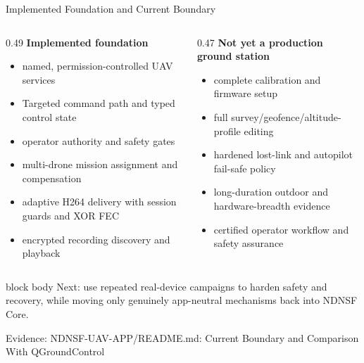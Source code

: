\documentclass[aspectratio=169]{beamer}
\newcommand{\bluebox}[1]{%
  \begin{beamercolorbox}[rounded=true,shadow=false,sep=0.65em,wd=0.94\linewidth]{block body}
  #1
  \end{beamercolorbox}
}
\newcommand{\evidence}[1]{%
  \vfill\par\noindent
  \begin{minipage}{\linewidth}
  \raggedright{\color{SoftGray}\tiny Evidence: #1}\par
  \end{minipage}
}
\begin{document}
\begin{frame}{Implemented Foundation and Current Boundary}
\footnotesize
\begin{columns}[T]
\begin{column}{0.49\textwidth}
\textbf{Implemented foundation}
\begin{itemize}
  \item named, permission-controlled UAV services
  \item Targeted command path and typed control state
  \item operator authority and safety gates
  \item multi-drone mission assignment and compensation
  \item adaptive H264 delivery with session guards and XOR FEC
  \item encrypted recording discovery and playback
\end{itemize}
\end{column}
\begin{column}{0.47\textwidth}
\textbf{Not yet a production ground station}
\begin{itemize}
  \item complete calibration and firmware setup
  \item full survey/geofence/altitude-profile editing
  \item hardened lost-link and autopilot fail-safe policy
  \item long-duration outdoor and hardware-breadth evidence
  \item certified operator workflow and safety assurance
\end{itemize}
\end{column}
\end{columns}

\vspace{0.65em}
\bluebox{Next: use repeated real-device campaigns to harden safety and recovery, while moving only genuinely app-neutral mechanisms back into NDNSF Core.}
\evidence{NDNSF-UAV-APP/README.md: Current Boundary and Comparison With QGroundControl}
\end{frame}
\end{document}
